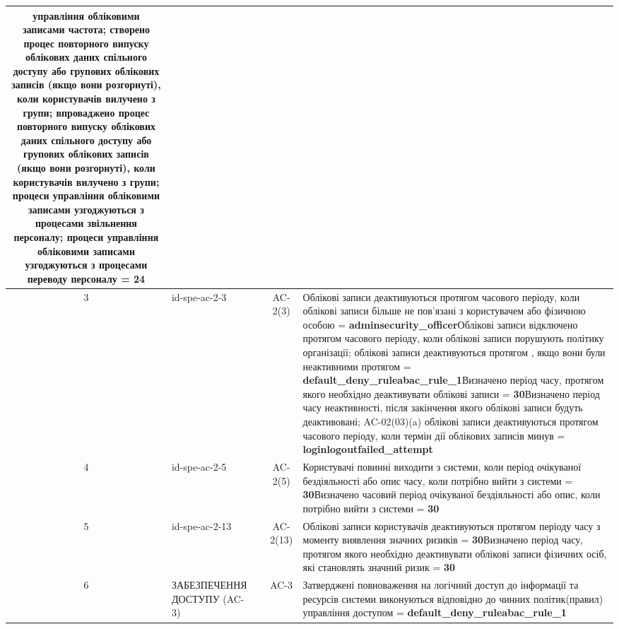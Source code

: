 \documentclass[10pt]{article}
\begin{document}
\begin{longtable}{|c|>{\raggedright\arraybackslash}p{2.5cm}|>{\raggedright\arraybackslash}p{4.5cm}|c|>{\raggedright\arraybackslash}p{4.5cm}|}
управління обліковими записами частота; створено процес повторного випуску облікових даних спільного доступу або групових облікових записів (якщо вони розгорнуті), коли користувачів вилучено з групи; впроваджено процес повторного випуску облікових даних спільного доступу або групових облікових записів (якщо вони розгорнуті), коли користувачів вилучено з групи; процеси управління обліковими записами узгоджуються з процесами звільнення персоналу; процеси управління обліковими записами узгоджуються з процесами переводу персоналу = \textbf{24} \\ \hline
3 & id-spe-ac-2-3 &  & AC-2(3) & Облікові записи деактивуються протягом часового періоду, коли облікові записи більше не пов'язані з користувачем або фізичною особою = \textbf{adminsecurity\_\allowbreak{}officer}\newline Облікові записи відключено протягом часового періоду, коли облікові записи порушують політику організації; облікові записи деактивуються протягом , якщо вони були неактивними протягом  = \textbf{default\_\allowbreak{}deny\_\allowbreak{}ruleabac\_\allowbreak{}rule\_\allowbreak{}1}\newline Визначено період часу, протягом якого необхідно деактивувати облікові записи = \textbf{30}\newline Визначено період часу неактивності, після закінчення якого облікові записи будуть деактивовані; AC-02(03)(a) облікові записи деактивуються протягом часового періоду, коли термін дії облікових записів минув = \textbf{loginlogoutfailed\_\allowbreak{}attempt} \\ \hline
4 & id-spe-ac-2-5 &  & AC-2(5) & Користувачі повинні виходити з системи, коли період очікуваної бездіяльності або опис часу, коли потрібно вийти з системи = \textbf{30}\newline Визначено часовий період очікуваної бездіяльності або опис, коли потрібно вийти з системи = \textbf{30} \\ \hline
5 & id-spe-ac-2-13 &  & AC-2(13) & Облікові записи користувачів деактивуються протягом періоду часу з моменту виявлення значних ризиків = \textbf{30}\newline Визначено період часу, протягом якого необхідно деактивувати облікові записи фізичних осіб, які становлять значний ризик = \textbf{30} \\ \hline
6 & ЗАБЕЗПЕЧЕННЯ ДОСТУПУ (AC-3) &  & AC-3 & Затверджені повноваження на логічний доступ до інформації та ресурсів системи виконуються відповідно до чинних політик(правил) управління доступом = \textbf{default\_\allowbreak{}deny\_\allowbreak{}ruleabac\_\allowbreak{}rule\_\allowbreak{}1} \\ \hline

\end{longtable}
\end{document}
